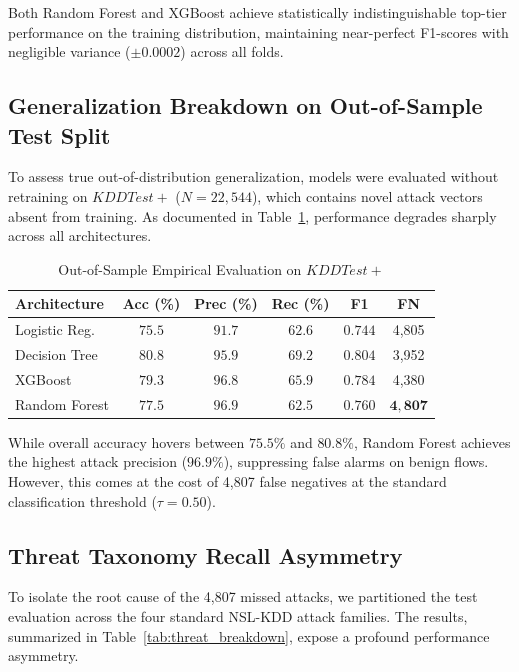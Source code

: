 \documentclass[conference]{IEEEtran}
\begin{document}
Both Random Forest and XGBoost achieve statistically indistinguishable top-tier performance on the training distribution, maintaining near-perfect F1-scores with negligible variance ($\pm 0.0002$) across all folds.

\subsection{Generalization Breakdown on Out-of-Sample Test Split}

To assess true out-of-distribution generalization, models were evaluated without retraining on $KDDTest+$ ($N=22,544$), which contains novel attack vectors absent from training. As documented in Table~\ref{tab:test_split}, performance degrades sharply across all architectures.

\begin{table}[h]
\caption{Out-of-Sample Empirical Evaluation on $KDDTest+$}
\label{tab:test_split}
\centering
\begin{tabular}{lccccc}
\toprule
\textbf{Architecture} & \textbf{Acc (\%)} & \textbf{Prec (\%)} & \textbf{Rec (\%)} & \textbf{F1} & \textbf{FN} \\
\midrule
Logistic Reg. & $75.5$ & $91.7$ & $62.6$ & $0.744$ & 4,805 \\
Decision Tree & $80.8$ & $95.9$ & $69.2$ & $0.804$ & 3,952 \\
XGBoost & $79.3$ & $96.8$ & $65.9$ & $0.784$ & 4,380 \\
Random Forest & $\mathbf{77.5}$ & $\mathbf{96.9}$ & $\mathbf{62.5}$ & $\mathbf{0.760}$ & $\mathbf{4,807}$ \\
\bottomrule
\end{tabular}
\end{table}

While overall accuracy hovers between $75.5\%$ and $80.8\%$, Random Forest achieves the highest attack precision ($96.9\%$), suppressing false alarms on benign flows. However, this comes at the cost of 4,807 false negatives at the standard classification threshold ($\tau = 0.50$).

\subsection{Threat Taxonomy Recall Asymmetry}

To isolate the root cause of the 4,807 missed attacks, we partitioned the test evaluation across the four standard NSL-KDD attack families. The results, summarized in Table~\ref{tab:threat_breakdown}, expose a profound performance asymmetry.
\end{document}
